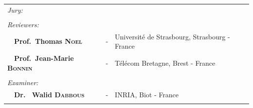 {\begin{titlepage}

\vspace{2mm}
 
 
\begin{center}
\noindent \large 
\begin{tabular}{llcl}
      \textit{Jury:}	& 		& & \\\\
     \textit{Reviewers:} & & & \\
 \multicolumn{2}{l}{~~\textbf{Prof.\ Thomas \textsc{Noel} }} 		& - & Universit\'{e} de Strasbourg, Strasbourg - France\\
 \multicolumn{2}{l}{~~\textbf{Prof.\ Jean-Marie \textsc{Bonnin}}} 		& - &  T\'{e}l\'{e}com Bretagne, Brest - France\\
\\
      \textit{Examiner:}& 		& & \\
      
\multicolumn{2}{l}{~~\textbf{Dr. \ Walid \textsc{Dabbous}}}           & - & INRIA, Biot - France\\
\\


  
\end{tabular}
\end{center}

\end{titlepage}

}

